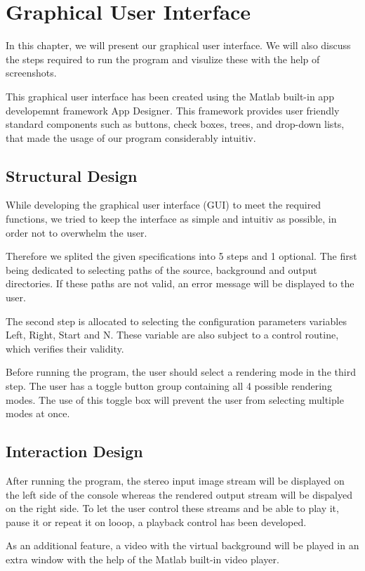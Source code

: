 \section{Graphical User Interface}
\label{GUI}

In this chapter, we will present our graphical user interface. We will also discuss the steps required to run the program and visulize these with the help of screenshots.

\medskip

This graphical user interface has been created using the Matlab built-in app developemnt framework App Designer. This framework provides user friendly standard components such as buttons, check boxes, trees, and drop-down lists, that made the usage of our program considerably intuitiv. 

\subsection{Structural Design}

While developing the graphical user interface (GUI) to meet the required  functions, we tried to keep the interface as simple and intuitiv as possible, in order not to overwhelm the user. 

\medskip

Therefore we splited the given specifications into 5 steps and 1 optional. The first being dedicated to selecting paths of the source, background and output directories. If these paths are not valid, an error message will be displayed to the user.

\medskip

The second step is allocated to selecting the configuration parameters variables Left, Right, Start and N. These variable are also subject to a control routine, which verifies their validity.
  
\medskip

Before running the program, the user should select a rendering mode in the third step. The user has a toggle button group containing all 4 possible rendering modes. The use of this toggle box will prevent the user from selecting multiple modes at once. 

\subsection{Interaction Design}

After running the program, the stereo input image stream will be displayed on the left side of the console whereas the rendered output stream will be dispalyed on the right side. To let the user control these streams and be able to play it, pause it or repeat it on looop, a playback control has been developed.

\medskip

As an additional feature, a video with the virtual background will be played in an extra window with the help of the Matlab built-in video player. 








